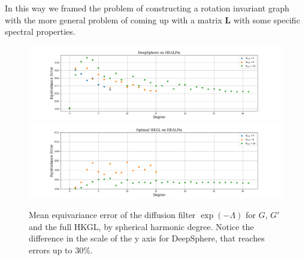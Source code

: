 \documentclass{article} %
\begin{document}
In this way we framed the problem of constructing a rotation invariant graph with the more general problem of coming up with a matrix $\mathbf L$ with some specific spectral properties.

\begin{figure}
	\centering
	\includegraphics[width=\textwidth]{DeepSphereonHEALPix.png}
	\includegraphics[width=\textwidth]{OptimalHKGLonHEALPix.png}
	\caption{\label{fig:DeepSphere equivariance error}Mean equivariance error of the diffusion filter $\exp(-\Lambda)$ for $G$, $G'$ and the full HKGL, by spherical harmonic degree. Notice the difference in the scale of the y axis for DeepSphere, that reaches errors up to 30\%.}
\end{figure}
\end{document}
